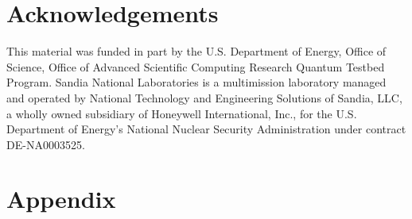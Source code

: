 \documentclass[aps,nofootinbib,pra,notitlepage,twocolumn]{revtex4-1}
\begin{document}

\section{Acknowledgements}
\label{sec:acknowledgements}
This material was funded in part by the U.S. Department of Energy, Office of Science, Office of Advanced Scientific Computing Research Quantum Testbed Program. Sandia National Laboratories is a multimission laboratory managed and operated by National Technology and Engineering Solutions of Sandia, LLC, a wholly owned subsidiary of Honeywell International, Inc., for the U.S. Department of Energy's National Nuclear Security Administration under contract DE-NA0003525.



\newpage
\section{Appendix}
\label{sec:appendix}

\end{document}

